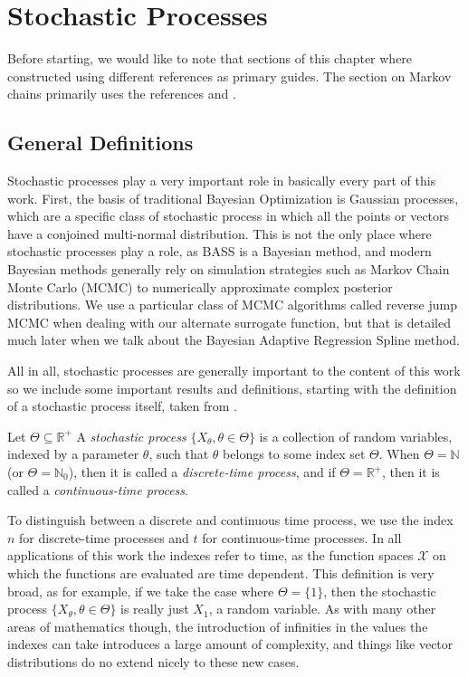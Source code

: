 \chapter{Stochastic Processes}

Before starting, we would like to note that sections of this chapter where constructed using different references as primary guides. The section on Markov chains primarily uses the references \cite{Zitkovic_2010} and \cite{hohendorff_introduction_2005}. 

\section{General Definitions}

Stochastic processes play a very important role in basically every part of this work. First, the basis of traditional Bayesian Optimization is Gaussian processes, which are a specific class of stochastic process in which all the points or vectors have a conjoined multi-normal distribution. This is not the only place where stochastic processes play a role, as BASS is a Bayesian method, and modern Bayesian methods generally rely on simulation strategies such as Markov Chain Monte Carlo (MCMC) to numerically approximate complex posterior distributions. We use a particular class of MCMC algorithms called reverse jump MCMC when dealing with our alternate surrogate function, but that is detailed much later when we talk about the Bayesian Adaptive Regression Spline method. 

All in all, stochastic processes are generally important to the content of this work so we include some important results and definitions, starting with the definition of a stochastic process itself, taken from \cite[\S 3.0]{Zitkovic_2010}. 

\begin{definition}
	Let $\Theta \subseteq \mathbb{R}^+$ A \textit{stochastic process} $\{ X_\theta, \theta \in \Theta \}$ is a collection of random variables, indexed by a parameter $\theta$, such that $\theta$ belongs to some index set $\Theta$. When $\Theta = \mathbb{N}$ (or $\Theta = \mathbb{N}_0$), then it is called a \textit{discrete-time process}, and if $\Theta = \mathbb{R}^+$, then it is called a \textit{continuous-time process}. 
\end{definition}

To distinguish between a discrete and continuous time process, we use the index $n$ for discrete-time processes and $t$ for continuous-time processes. 
In all applications of this work the indexes refer to time, as the function spaces $\mathcal{X}$ on which the functions are evaluated are time dependent. 
This definition is very broad, as for example, if we take the case where $\Theta = \{1\}$, then the stochastic process $\{ X_\theta, \theta \in \Theta \}$ is really just $X_1$, a random variable. 
As with many other areas of mathematics though, the introduction of infinities in the values the indexes can take introduces a large amount of complexity, and things like vector distributions do no extend nicely to these new cases. 

